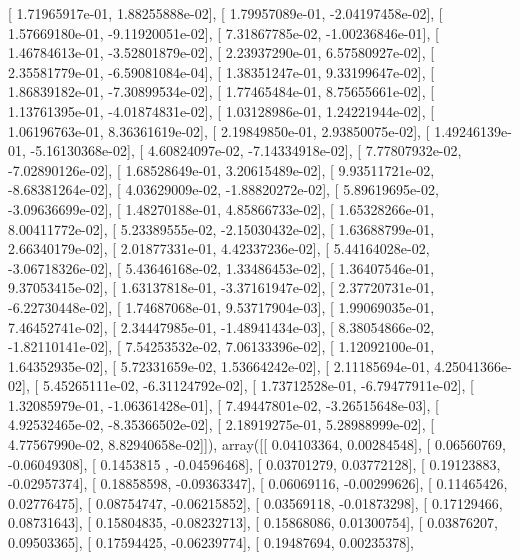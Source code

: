 \documentclass{article}
\begin{document}
       [  1.71965917e-01,   1.88255888e-02],
       [  1.79957089e-01,  -2.04197458e-02],
       [  1.57669180e-01,  -9.11920051e-02],
       [  7.31867785e-02,  -1.00236846e-01],
       [  1.46784613e-01,  -3.52801879e-02],
       [  2.23937290e-01,   6.57580927e-02],
       [  2.35581779e-01,  -6.59081084e-04],
       [  1.38351247e-01,   9.33199647e-02],
       [  1.86839182e-01,  -7.30899534e-02],
       [  1.77465484e-01,   8.75655661e-02],
       [  1.13761395e-01,  -4.01874831e-02],
       [  1.03128986e-01,   1.24221944e-02],
       [  1.06196763e-01,   8.36361619e-02],
       [  2.19849850e-01,   2.93850075e-02],
       [  1.49246139e-01,  -5.16130368e-02],
       [  4.60824097e-02,  -7.14334918e-02],
       [  7.77807932e-02,  -7.02890126e-02],
       [  1.68528649e-01,   3.20615489e-02],
       [  9.93511721e-02,  -8.68381264e-02],
       [  4.03629009e-02,  -1.88820272e-02],
       [  5.89619695e-02,  -3.09636699e-02],
       [  1.48270188e-01,   4.85866733e-02],
       [  1.65328266e-01,   8.00411772e-02],
       [  5.23389555e-02,  -2.15030432e-02],
       [  1.63688799e-01,   2.66340179e-02],
       [  2.01877331e-01,   4.42337236e-02],
       [  5.44164028e-02,  -3.06718326e-02],
       [  5.43646168e-02,   1.33486453e-02],
       [  1.36407546e-01,   9.37053415e-02],
       [  1.63137818e-01,  -3.37161947e-02],
       [  2.37720731e-01,  -6.22730448e-02],
       [  1.74687068e-01,   9.53717904e-03],
       [  1.99069035e-01,   7.46452741e-02],
       [  2.34447985e-01,  -1.48941434e-03],
       [  8.38054866e-02,  -1.82110141e-02],
       [  7.54253532e-02,   7.06133396e-02],
       [  1.12092100e-01,   1.64352935e-02],
       [  5.72331659e-02,   1.53664242e-02],
       [  2.11185694e-01,   4.25041366e-02],
       [  5.45265111e-02,  -6.31124792e-02],
       [  1.73712528e-01,  -6.79477911e-02],
       [  1.32085979e-01,  -1.06361428e-01],
       [  7.49447801e-02,  -3.26515648e-03],
       [  4.92532465e-02,  -8.35366502e-02],
       [  2.18919275e-01,   5.28988999e-02],
       [  4.77567990e-02,   8.82940658e-02]]), array([[ 0.04103364,  0.00284548],
       [ 0.06560769, -0.06049308],
       [ 0.1453815 , -0.04596468],
       [ 0.03701279,  0.03772128],
       [ 0.19123883, -0.02957374],
       [ 0.18858598, -0.09363347],
       [ 0.06069116, -0.00299626],
       [ 0.11465426,  0.02776475],
       [ 0.08754747, -0.06215852],
       [ 0.03569118, -0.01873298],
       [ 0.17129466,  0.08731643],
       [ 0.15804835, -0.08232713],
       [ 0.15868086,  0.01300754],
       [ 0.03876207,  0.09503365],
       [ 0.17594425, -0.06239774],
       [ 0.19487694,  0.00235378],
\end{document}
